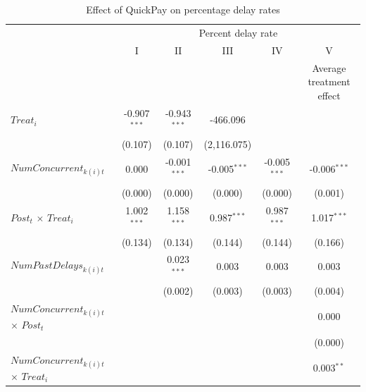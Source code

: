 \documentclass[
]{article}
\begin{document}
\begin{table}[htbp]
   \caption{Effect of QuickPay on percentage delay rates}
   \centering
   \small
   \begin{tabular}{lccccc}
      \toprule
       & \multicolumn{5}{c}{Percent delay rate}\\
                                                                     & I              & II             & III            & IV             & V\\  
       & \multicolumn{4}{c}{} & Average treatment effect \\ 
      \midrule 
      $Treat_i$                                                      & -0.907$^{***}$ & -0.943$^{***}$ & -466.096       &                &   \\   
                                                                     & (0.107)        & (0.107)        & (2,116.075)    &                &   \\   
      $NumConcurrent_{k(i)t}$                                        & 0.000          & -0.001$^{***}$ & -0.005$^{***}$ & -0.005$^{***}$ & -0.006$^{***}$\\   
                                                                     & (0.000)        & (0.000)        & (0.000)        & (0.000)        & (0.001)\\   
      $Post_t$ $\times$ $Treat_i$                                    & 1.002$^{***}$  & 1.158$^{***}$  & 0.987$^{***}$  & 0.987$^{***}$  & 1.017$^{***}$\\   
                                                                     & (0.134)        & (0.134)        & (0.144)        & (0.144)        & (0.166)\\   
      $NumPastDelays_{k(i)t}$                                        &                & 0.023$^{***}$  & 0.003          & 0.003          & 0.003\\   
                                                                     &                & (0.002)        & (0.003)        & (0.003)        & (0.004)\\   
      $NumConcurrent_{k(i)t}$ $\times$ $Post_t$                      &                &                &                &                & 0.000\\   
                                                                     &                &                &                &                & (0.000)\\   
      $NumConcurrent_{k(i)t}$ $\times$ $Treat_i$                     &                &                &                &                & 0.003$^{**}$\\   

\end{tabular}
\end{table}
\end{document}
